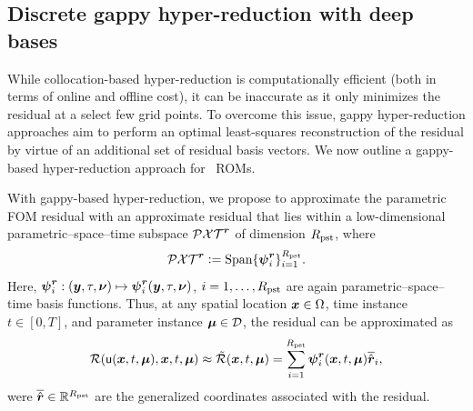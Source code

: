 \documentclass[3p,computermodern,10pt]{elsarticle}
\begin{document}
\subsection{Discrete gappy hyper-reduction with deep bases}
While collocation-based hyper-reduction is computationally efficient (both in terms of online and offline cost), it can be inaccurate as it only minimizes the residual at a select few grid points. To overcome this issue, gappy hyper-reduction approaches aim to perform an optimal least-squares reconstruction of the residual by virtue of an additional set of residual basis vectors. We now outline a gappy-based hyper-reduction approach for \parametricSpaceTimeAcronym\ ROMs. 

With gappy-based hyper-reduction, we propose to approximate the parametric FOM residual with an approximate residual that lies within a low-dimensional parametric--space--time subspace $\mathcal{PXT}^{\boldsymbol r}$ of dimension $R_{\text{pst}}$,  where
\begin{equation}\label{eq:psttrialspace_def}
 \mathcal{PXT}^{\boldsymbol r} \vcentcolon= 
        \text{Span}\{\boldsymbol \psi^{\boldsymbol r}_i\}_{i=1}^{R_{\text{pst}}}. 
\end{equation}
Here, $\boldsymbol \psi^{\boldsymbol r}_i: (\boldsymbol y,\tau,\boldsymbol \nu) \mapsto \boldsymbol \psi^{\boldsymbol r}_i(\boldsymbol y,\tau,\boldsymbol \nu)$, $i=1,\ldots,R_{\text{pst}}$ are again parametric--space--time basis functions. Thus, at any spatial location $\boldsymbol x \in \Omega$, time instance $t\in[0,T]$, and parameter instance $\boldsymbol \mu \in \mathcal{D}$, the residual can be approximated as
$$\mathcal{R}(\mathsf{u}(\boldsymbol x, t,\boldsymbol \mu),\boldsymbol x,t,\boldsymbol \mu) \approx \tilde{\mathcal{R}}( \boldsymbol x,t,\boldsymbol \mu) = \sum_{i=1}^{R_{\text{pst}}} \boldsymbol \psi^{\boldsymbol r}_i(\boldsymbol x,t,\boldsymbol \mu) \overline{\hat{\boldsymbol r}}_i,$$
were $\overline{\hat{\boldsymbol r}} \in \mathbb{R}^{R_{\text{pst}}}$ are the generalized coordinates associated with the residual.
\end{document}

